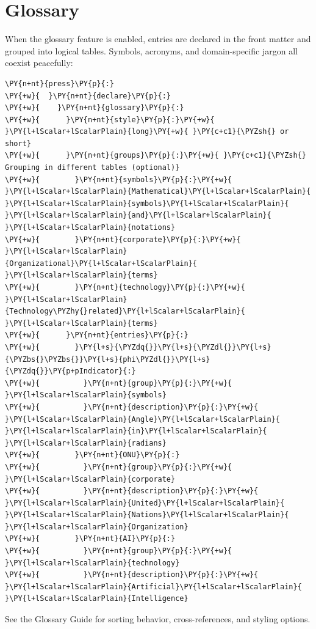 \documentclass[a4paper,twoside]{article}
\begin{document}
\section{Glossary}
When the glossary feature is enabled, entries are declared in the front matter and grouped into logical tables. Symbols, acronyms, and domain-specific jargon all coexist peacefully:
\begin{tscode}[lang=yaml, engine=pygments]
\begin{Verbatim}[commandchars=\\\{\},breaklines, breakanywhere, commandchars=\\\{\}]
\PY{n+nt}{press}\PY{p}{:}
\PY{+w}{  }\PY{n+nt}{declare}\PY{p}{:}
\PY{+w}{    }\PY{n+nt}{glossary}\PY{p}{:}
\PY{+w}{      }\PY{n+nt}{style}\PY{p}{:}\PY{+w}{ }\PY{l+lScalar+lScalarPlain}{long}\PY{+w}{ }\PY{c+c1}{\PYZsh{} or short}
\PY{+w}{      }\PY{n+nt}{groups}\PY{p}{:}\PY{+w}{ }\PY{c+c1}{\PYZsh{} Grouping in different tables (optional)}
\PY{+w}{        }\PY{n+nt}{symbols}\PY{p}{:}\PY{+w}{ }\PY{l+lScalar+lScalarPlain}{Mathematical}\PY{l+lScalar+lScalarPlain}{ }\PY{l+lScalar+lScalarPlain}{symbols}\PY{l+lScalar+lScalarPlain}{ }\PY{l+lScalar+lScalarPlain}{and}\PY{l+lScalar+lScalarPlain}{ }\PY{l+lScalar+lScalarPlain}{notations}
\PY{+w}{        }\PY{n+nt}{corporate}\PY{p}{:}\PY{+w}{ }\PY{l+lScalar+lScalarPlain}{Organizational}\PY{l+lScalar+lScalarPlain}{ }\PY{l+lScalar+lScalarPlain}{terms}
\PY{+w}{        }\PY{n+nt}{technology}\PY{p}{:}\PY{+w}{ }\PY{l+lScalar+lScalarPlain}{Technology\PYZhy{}related}\PY{l+lScalar+lScalarPlain}{ }\PY{l+lScalar+lScalarPlain}{terms}
\PY{+w}{      }\PY{n+nt}{entries}\PY{p}{:}
\PY{+w}{        }\PY{l+s}{\PYZdq{}}\PY{l+s}{\PYZdl{}}\PY{l+s}{\PYZbs{}\PYZbs{}}\PY{l+s}{phi\PYZdl{}}\PY{l+s}{\PYZdq{}}\PY{p+pIndicator}{:}
\PY{+w}{          }\PY{n+nt}{group}\PY{p}{:}\PY{+w}{ }\PY{l+lScalar+lScalarPlain}{symbols}
\PY{+w}{          }\PY{n+nt}{description}\PY{p}{:}\PY{+w}{ }\PY{l+lScalar+lScalarPlain}{Angle}\PY{l+lScalar+lScalarPlain}{ }\PY{l+lScalar+lScalarPlain}{in}\PY{l+lScalar+lScalarPlain}{ }\PY{l+lScalar+lScalarPlain}{radians}
\PY{+w}{        }\PY{n+nt}{ONU}\PY{p}{:}
\PY{+w}{          }\PY{n+nt}{group}\PY{p}{:}\PY{+w}{ }\PY{l+lScalar+lScalarPlain}{corporate}
\PY{+w}{          }\PY{n+nt}{description}\PY{p}{:}\PY{+w}{ }\PY{l+lScalar+lScalarPlain}{United}\PY{l+lScalar+lScalarPlain}{ }\PY{l+lScalar+lScalarPlain}{Nations}\PY{l+lScalar+lScalarPlain}{ }\PY{l+lScalar+lScalarPlain}{Organization}
\PY{+w}{        }\PY{n+nt}{AI}\PY{p}{:}
\PY{+w}{          }\PY{n+nt}{group}\PY{p}{:}\PY{+w}{ }\PY{l+lScalar+lScalarPlain}{technology}
\PY{+w}{          }\PY{n+nt}{description}\PY{p}{:}\PY{+w}{ }\PY{l+lScalar+lScalarPlain}{Artificial}\PY{l+lScalar+lScalarPlain}{ }\PY{l+lScalar+lScalarPlain}{Intelligence}
\end{Verbatim}
\end{tscode}
See the Glossary Guide for sorting behavior, cross-references, and styling options.
\end{document}
